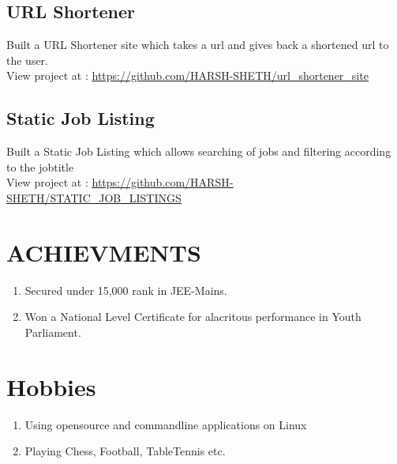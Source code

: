 \documentclass[12pt]{article}
\begin{document}
\subsection*{URL Shortener}
\parbox{\textwidth}{ Built a URL Shortener site which takes a url and gives back a shortened url to the user.  
\\ View project at : \underline{\url{https://github.com/HARSH-SHETH/url_shortener_site}}
}

\subsection*{Static Job Listing}
\parbox{\textwidth}{ Built a Static Job Listing which allows searching of jobs and filtering according to the jobtitle
\\ View project at : \underline{\url{https://github.com/HARSH-SHETH/STATIC_JOB_LISTINGS}}
}
\newpage
\section{ACHIEVMENTS}
\begin{enumerate}
  \item Secured under 15,000 rank in JEE-Mains.
  \item Won a National Level Certificate for alacritous performance in Youth Parliament.
\end{enumerate}

\section{Hobbies}
\begin{enumerate}
  \item Using opensource and commandline applications on Linux
  \item Playing Chess, Football, TableTennis etc.
\end{enumerate}
\end{document}
